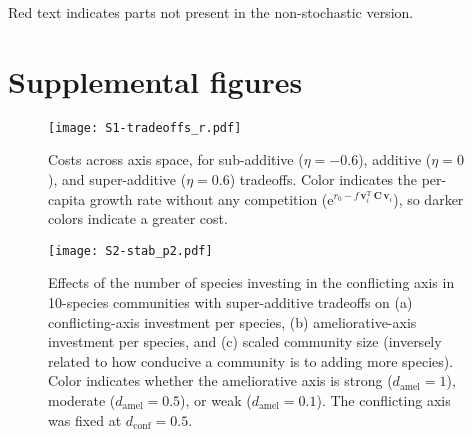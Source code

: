 Red text indicates parts not present in the non-stochastic version. 









\clearpage

\section*{Supplemental figures}




\begin{figure}[ht!]
\centering
\texttt{[image: S1-tradeoffs\_r.pdf]}
\caption{Costs across axis space, for sub-additive ($\eta = -0.6$), 
additive ($\eta = 0$), and super-additive ($\eta = 0.6$) tradeoffs.
Color indicates the per-capita growth rate without any competition
($\text{e}^{r_0 - f \, \mathbf{v}_i^{\text{T}} \, \mathbf{C} \, \mathbf{v}_i}$),
so darker colors indicate a greater cost.}
\label{fig:tradeoffs-r}
\end{figure}





\begin{figure}[ht!]
\centering
\texttt{[image: S2-stab\_p2.pdf]}
\caption{Effects of the number of species investing in the conflicting axis
in 10-species communities with super-additive tradeoffs on 
(a) conflicting-axis investment per species,
(b) ameliorative-axis investment per species, and 
(c) scaled community size (inversely related to how conducive a community 
is to adding more species).
Color indicates whether the ameliorative axis is strong ($d_{\text{amel}} = 1$),
moderate ($d_{\text{amel}} = 0.5$), or weak ($d_{\text{amel}} = 0.1$).
The conflicting axis was fixed at $d_{\text{conf}} = 0.5$.
}
\label{fig:stabilizers2}
\end{figure}


